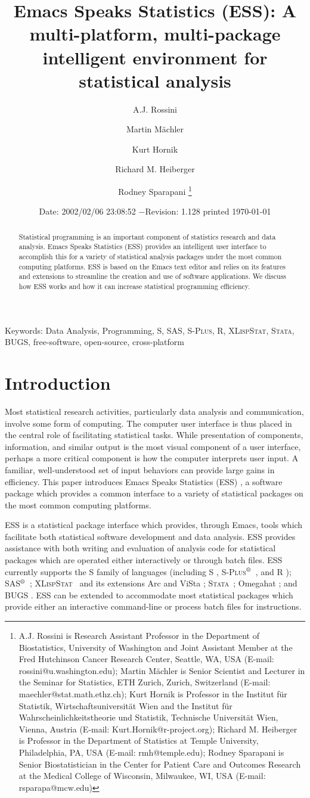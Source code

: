 \documentclass{article}
\title{Emacs Speaks Statistics (ESS): A multi-platform, multi-package
intelligent environment for statistical analysis}
\author{A.J. Rossini \and Martin M{\"a}chler \and Kurt Hornik \and Richard
  M. Heiberger \and Rodney Sparapani \footnote{%
    A.J. Rossini is Research Assistant Professor in the Department of
    Biostatistics, University of Washington and Joint Assistant Member at
    the Fred Hutchinson Cancer Research Center, Seattle, WA, USA
    (E-mail: rossini@u.washington.edu);
    Martin M{\"a}chler is Senior Scientist and Lecturer in the Seminar for
    Statistics, ETH Zurich, Zurich, Switzerland
    (E-mail: maechler@stat.math.ethz.ch);
    Kurt Hornik is Professor in the Institut f{\"u}r Statistik,
    Wirtschaftsuniversit{\"a}t Wien and the Institut f{\"u}r
    Wahrscheinlichkeitstheorie und Statistik, Technische Universit{\"a}t
    Wien, Vienna, Austria (E-mail: Kurt.Hornik@r-project.org);
    Richard M. Heiberger is Professor in the Department of Statistics at
    Temple University, Philadelphia, PA, USA (E-mail: rmh@temple.edu);
    Rodney Sparapani is Senior Biostatistician in the Center for Patient
    Care and Outcomes Research at the Medical College of Wisconsin, 
    Milwaukee, WI, USA (E-mail: rsparapa@mcw.edu)}}
\date{$ $Date: 2002/02/06 23:08:52 $ - $Revision: 1.128 $ $\tiny printed \today}
\newif\ifdraft
\renewcommand{\baselinestretch}{1.5}
\newcommand*{\regstrd}{$^{\mbox{\scriptsize{\textregistered}}}$}
\newcommand*{\SAS}{\textsc{SAS}}
\newcommand*{\Splus}{\textsc{S-Plus}}
\newcommand*{\XLispStat}{\textsc{XLispStat}}
\newcommand*{\Stata}{\textsc{Stata}}
\begin{document}

\ifdraft
\setcounter{page}{0}
\tableofcontents
\fi

\maketitle

\ifdraft{}%
\else%
 \renewcommand{\baselinestretch}{1.5}
\fi

\begin{abstract}
  Statistical programming is an important component of statistics
  research and data analysis.  Emacs Speaks Statistics (ESS) provides
  an intelligent user interface to accomplish this for a variety of
  statistical analysis packages under the most common computing
  platforms.  ESS is based on the Emacs text editor and relies on its
  features and extensions to streamline the creation and use of
  software applications.  We discuss how ESS works and how it can
  increase statistical programming efficiency.
\end{abstract}

\noindent Keywords: Data Analysis, Programming, 
S, \SAS, \Splus, R, \XLispStat, \Stata, BUGS, free-software,
open-source, cross-platform

\section{Introduction}
\label{sec:introduction}

Most statistical research activities, particularly data analysis and
communication, involve some form of computing.  The computer user
interface is thus placed in the central role of facilitating
statistical tasks.  While presentation of components, information, and
similar output is the most visual component of a user interface,
perhaps a more critical component is how the computer interprets user
input.  A familiar, well-understood set of input behaviors can provide
large gains in efficiency.  This paper introduces Emacs Speaks
Statistics (ESS) \citep{ESS}, a software package which provides a
common interface to a variety of statistical packages on the most
common computing platforms.

ESS is a statistical package interface which provides, through Emacs,
tools which facilitate both statistical software development and data
analysis.  ESS provides assistance with both writing and evaluation of
analysis code for statistical packages which are operated either
interactively or through batch files.  ESS currently supports the S
family of languages (including S \citep{BecRCW88,ChaJH92,ChaJ98},
\Splus\regstrd\ \citep{Splus}, and R \citep{ihak:gent:1996});
\SAS\regstrd\ \citep{SAS:8}; \XLispStat\ \citep{Tier90} and its
extensions Arc \citep{Cook:Weisberg:1999} and ViSta
\citep{youn:fald:mcfa:1992}; \Stata\ \citep{Stata:6.0}; Omegahat
\citep{DTLang:2000}; and BUGS \citep{BUGS}.  ESS can be extended to
accommodate most statistical packages which provide either an
interactive command-line or process batch files for instructions.
\end{document}
